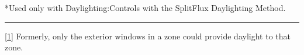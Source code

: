 *Used only with Daylighting:Controls with the SplitFlux Daylighting Method.

\begin{center}\rule{0.5\linewidth}{\linethickness}\end{center}

\protect\hyperlink{ux5fftnref1}{{[}1{]}} Formerly, only the exterior windows in a zone could provide daylight to that zone.